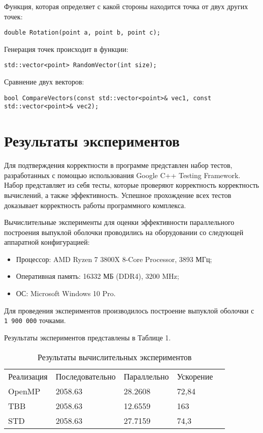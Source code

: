 \documentclass{report}
\begin{document}
\newpage
\par Функция, которая определяет с какой стороны находится точка от двух других точек:
\begin{lstlisting}
double Rotation(point a, point b, point c);
\end{lstlisting}
\par  Генерация точек происходит в функции:
\begin{lstlisting}
std::vector<point> RandomVector(int size);
\end{lstlisting}
\par Сравнение двух векторов:
\begin{lstlisting}
bool CompareVectors(const std::vector<point>& vec1, const std::vector<point>& vec2);
\end{lstlisting}
\newpage

\section*{Результаты экспериментов}
Для подтверждения корректности в программе представлен набор тестов, разработанных с помощью использования Google C++ Testing Framework. Набор представляет из себя тесты, которые проверяют корректность корректность вычислений, а также эффективность. Успешное прохождение всех тестов доказывает корректность работы программного комплекса.
\par Вычислительные эксперименты для оценки эффективности параллельного построения выпуклой оболочки проводились на оборудовании со следующей аппаратной конфигурацией:

\begin{itemize}
\item Процессор: AMD Ryzen 7 3800X 8-Core Processor, 3893 МГц;
\item Оперативная память: 16332 МБ (DDR4), 3200 MHz;
\item ОС: Microsoft Windows 10 Pro.
\end{itemize}

\par Для проведения экспериментов производилось построение выпуклой оболочки с 
\verb|1 900 000| точками. 
\par Результаты экспериментов представлены в Таблице 1.

\begin{table}[!h]
\caption{Результаты вычислительных экспериментов}
\centering
\begin{tabular}{lllll}
Реализация & Последовательно & Параллельно & Ускорение  \\
OpenMP     & 2058.63            & 28.2608  & 72,84       \\
TBB        & 2058.63            & 12.6559  & 163       \\
STD        & 2058.63            & 27.7159  & 74,3       \\
\end{tabular}
\end{table}
\end{document}
